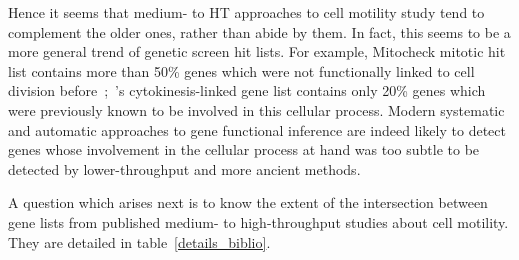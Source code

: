 Hence it seems that medium- to HT approaches to cell motility study tend to complement the older ones, rather than abide by them. In fact, this seems to be a more general trend of genetic screen hit lists. For example, Mitocheck mitotic hit list contains more than 50\% genes which were not functionally linked to cell division before~\cite{pmid20360735};~\cite{pmid15547975}'s cytokinesis-linked gene list contains only 20\% genes which were previously known to be involved in this cellular process. Modern systematic and automatic approaches to gene functional inference are indeed likely to detect genes whose involvement in the cellular process at hand was too subtle to be detected by lower-throughput and more ancient methods.

A question which arises next is to know the extent of the intersection between gene lists from published medium- to high-throughput studies about cell motility. They are detailed in table~\ref{details_biblio}.

